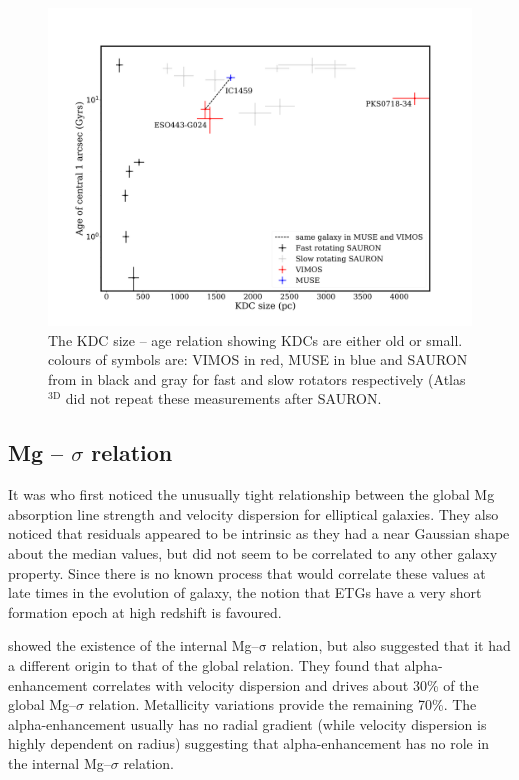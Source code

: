 		\begin{figure}
			\centering
			\includegraphics[width=.7\textwidth]{chapter4/KDC_size_age.png}
			\caption[KDC dichotomy]{The KDC size -- age relation showing KDCs are either old or small. colours of symbols are: VIMOS in red, MUSE in blue and SAURON from \citet{Kuntschner2010} in black and gray for fast and slow rotators respectively (Atlas$^\text{3D}$ did not repeat these measurements after SAURON.}
			\label{fig:KDC}
		\end{figure}


	\subsection{Mg -- $\sigma$ relation}
		\label{subsec:Mgsigma}

		It was \citet{Bender1993} who first noticed the unusually tight relationship between the global Mg absorption line strength and velocity dispersion for elliptical galaxies. They also noticed that residuals appeared to be intrinsic as they had a near Gaussian shape about the median values, but did not seem to be correlated to any other galaxy property. Since there is no known process that would correlate these values at late times in the evolution of galaxy, the notion that ETGs have a very short formation epoch at high redshift is favoured. 

		\citet{Mehlert2003} showed the existence of the internal Mg--$\mathrm{\sigma}$ relation, but also suggested that it had a different origin to that of the global relation. They found that alpha-enhancement correlates with velocity dispersion and drives about 30\% of the global Mg--$\sigma$ relation. Metallicity variations provide the remaining 70\%. The alpha-enhancement usually has no radial gradient (while velocity dispersion is highly dependent on radius) suggesting that alpha-enhancement has no role in the internal Mg--$\sigma$ relation. 

